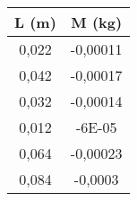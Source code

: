 \begin{tabular}{|c|c|}
\hline
L (m)	&M (kg)\\ \hline
0,022	&-0,00011\\
0,042	&-0,00017\\
0,032	&-0,00014\\
0,012	&-6E-05\\
0,064	&-0,00023\\
0,084	&-0,0003\\ \hline
\end{tabular}


